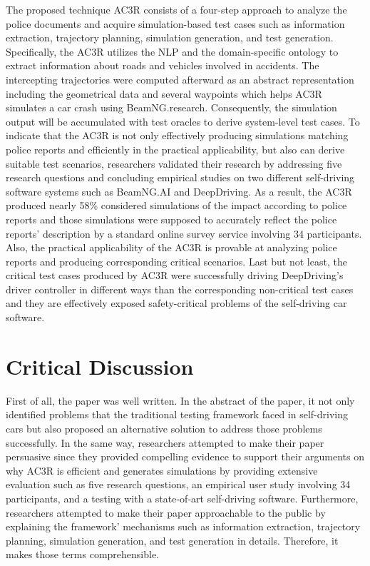 \documentclass[10pt,a4paper]{report}
\begin{document}
The proposed technique AC3R consists of a four-step approach to analyze the police documents and acquire simulation-based test cases such as information extraction, trajectory planning, simulation generation, and test generation.
%
Specifically, the AC3R utilizes the NLP and the domain-specific ontology to extract information about roads and vehicles involved in accidents.
%
The intercepting trajectories were computed afterward as an abstract representation including the geometrical data and several waypoints which helps AC3R simulates a car crash using BeamNG.research.
%
Consequently, the simulation output will be accumulated with test oracles to derive system-level test cases.
%
To indicate that the AC3R is not only effectively producing simulations matching police reports and efficiently in the practical applicability, but also can derive suitable test scenarios, researchers validated their research by addressing five research questions and concluding empirical studies on two different self-driving software systems such as BeamNG.AI and DeepDriving.
%
As a result, the AC3R produced nearly 58\% considered simulations of the impact according to police reports and those simulations were supposed to accurately reflect the police reports' description by a standard online survey service involving 34 participants. 
%
Also, the practical applicability of the AC3R is provable at analyzing police reports and producing corresponding critical scenarios.
%
Last but not least, the critical test cases produced by AC3R were successfully driving DeepDriving’s driver controller in different ways than the corresponding non-critical test cases and they are effectively exposed safety-critical problems of the self-driving car software.

\section{Critical Discussion}
First of all, the paper was well written. In the abstract of the paper, it not only identified problems that the traditional testing framework faced in self-driving cars but also proposed an alternative solution to address those problems successfully. 
%
In the same way, researchers attempted to make their paper persuasive since they provided compelling evidence to support their arguments on why AC3R is efficient and generates simulations by providing extensive evaluation such as five research questions, an empirical user study involving 34 participants, and a testing with a state-of-art self-driving software.
%
Furthermore, researchers attempted to make their paper approachable to the public by explaining the framework' mechanisms such as information extraction, trajectory planning, simulation generation, and test generation in details. Therefore, it makes those terms comprehensible. 
\blindtext
\blindtext
\blindtext
\blindtext
\end{document}
